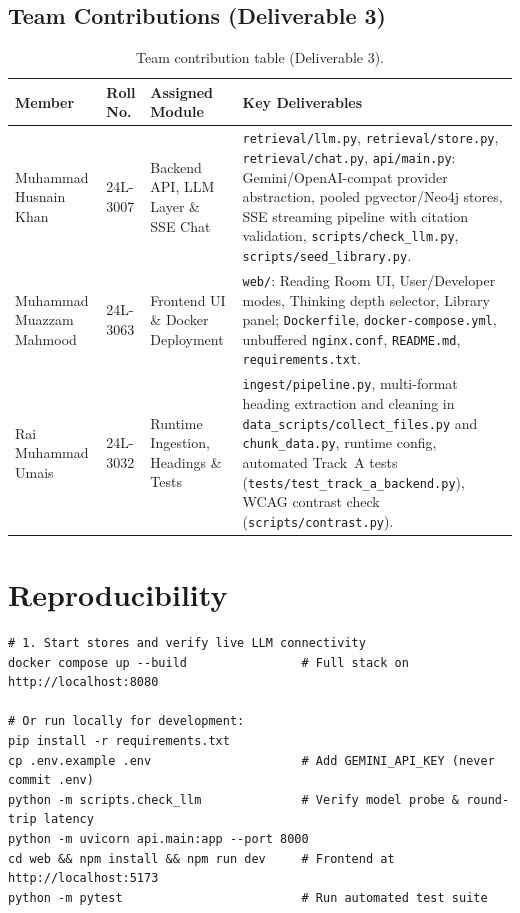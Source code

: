\documentclass[11pt,a4paper]{article}
\begin{document}
\subsection{Team Contributions (Deliverable 3)}
\begin{table}[H]
\centering
\caption{Team contribution table (Deliverable 3).}
\label{tab:team-d3}
\small
\renewcommand{\arraystretch}{1.25}
\begin{tabularx}{\textwidth}{@{}L{3.1cm} L{1.9cm} L{3.1cm} Y@{}}
\toprule
\textbf{Member} & \textbf{Roll No.} & \textbf{Assigned Module} & \textbf{Key Deliverables} \\
\midrule
Muhammad Husnain Khan & 24L-3007 & Backend API, LLM Layer \& SSE Chat & \texttt{retrieval/llm.py}, \texttt{retrieval/store.py}, \texttt{retrieval/chat.py}, \texttt{api/main.py}: Gemini/OpenAI-compat provider abstraction, pooled pgvector/Neo4j stores, SSE streaming pipeline with citation validation, \texttt{scripts/check\_llm.py}, \texttt{scripts/seed\_library.py}. \\
\addlinespace
Muhammad Muazzam Mahmood & 24L-3063 & Frontend UI \& Docker Deployment & \texttt{web/}: Reading Room UI, User/Developer modes, Thinking depth selector, Library panel; \texttt{Dockerfile}, \texttt{docker-compose.yml}, unbuffered \texttt{nginx.conf}, \texttt{README.md}, \texttt{requirements.txt}. \\
\addlinespace
Rai Muhammad Umais & 24L-3032 & Runtime Ingestion, Headings \& Tests & \texttt{ingest/pipeline.py}, multi-format heading extraction and cleaning in \texttt{data\_scripts/collect\_files.py} and \texttt{chunk\_data.py}, runtime config, automated Track~A tests (\texttt{tests/test\_track\_a\_backend.py}), WCAG contrast check (\texttt{scripts/contrast.py}). \\
\bottomrule
\end{tabularx}
\end{table}

\section*{Reproducibility}
\begin{verbatim}
# 1. Start stores and verify live LLM connectivity
docker compose up --build                # Full stack on http://localhost:8080

# Or run locally for development:
pip install -r requirements.txt
cp .env.example .env                     # Add GEMINI_API_KEY (never commit .env)
python -m scripts.check_llm              # Verify model probe & round-trip latency
python -m uvicorn api.main:app --port 8000
cd web && npm install && npm run dev     # Frontend at http://localhost:5173
python -m pytest                         # Run automated test suite
\end{verbatim}
\end{document}
